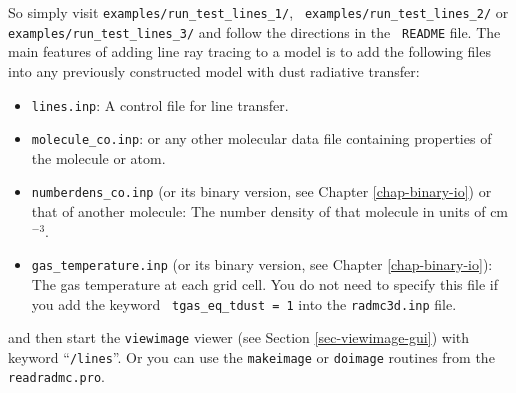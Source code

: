 \documentclass{report}
\begin{document}
So simply visit {\small\tt examples/run\_test\_lines\_1/}, {\small\tt
  examples/run\_test\_lines\_2/} or {\small\tt
  examples/run\_test\_lines\_3/} and follow the directions in the {\small\tt
  README} file. The main features of adding line ray tracing to a model is
to add the following files into any previously constructed model with dust
radiative transfer:
\begin{itemize}
\item {\small\tt lines.inp}: A control file for line transfer. 
\item {\small\tt molecule\_co.inp}: or any other molecular data file
  containing properties of the molecule or atom.
\item {\small\tt numberdens\_co.inp} (or its binary version, see Chapter
  \ref{chap-binary-io}) or that of another molecule: The number density of
  that molecule in units of cm$^{-3}$.
\item {\small\tt gas\_temperature.inp} (or its binary version, see Chapter
  \ref{chap-binary-io}): The gas temperature at each grid cell. You do not
  need to specify this file if you add the keyword {\small\tt
    tgas\_eq\_tdust = 1} into the {\small\tt radmc3d.inp} file.
\end{itemize}
and then start the {\small\tt viewimage} viewer (see Section
\ref{sec-viewimage-gui}) with keyword ``{\small\tt /lines}''. Or you can use
the {\small\tt makeimage} or {\small\tt doimage} routines from the
{\small\tt readradmc.pro}.
\end{document}
